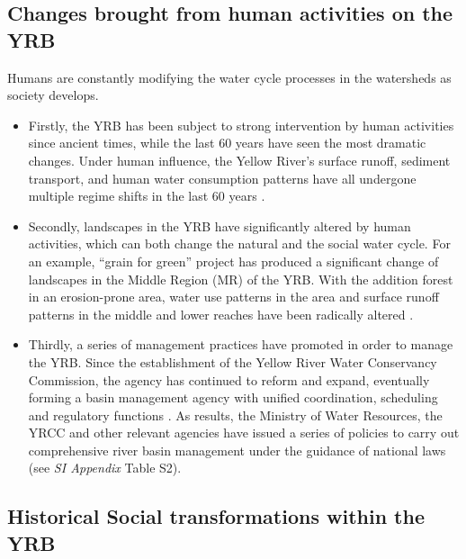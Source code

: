 \documentclass[9pt,twoside,lineno]{pnas-new}
\begin{document}
\subsection*{Changes brought from human activities on the YRB}
Humans are constantly modifying the water cycle processes in the watersheds as society develops.
\begin{itemize}
    \item Firstly, the YRB has been subject to strong intervention by human activities since ancient times, while the last 60 years have seen the most dramatic changes. Under human influence, the Yellow River's surface runoff, sediment transport, and human water consumption patterns have all undergone multiple regime shifts in the last 60 years
    \cite{wu2020,wangReducedsedimenttransport2016}.
    \item Secondly, landscapes in the YRB have significantly altered by human activities, which can both change the natural and the social water cycle. For an example, ``grain for green'' project has produced a significant change of landscapes in the Middle Region (MR) of the YRB. With the addition forest in an erosion-prone area, water use patterns in the area and surface runoff patterns in the middle and lower reaches have been radically altered
    \cite{wu2020}.
    \item Thirdly, a series of management practices have promoted in order to manage the YRB. Since the establishment of the Yellow River Water Conservancy Commission, the agency has continued to reform and expand, eventually forming a basin management agency with unified coordination, scheduling and regulatory functions \cite{yellowriverconservancycommissionYellowRiverBasin2013}.
    As results, the Ministry of Water Resources, the YRCC and other relevant agencies have issued a series of policies to carry out comprehensive river basin management under the guidance of national laws (see \textit{SI Appendix} Table S2).
\end{itemize}

\subsection*{Historical Social transformations within the YRB}
\end{document}

